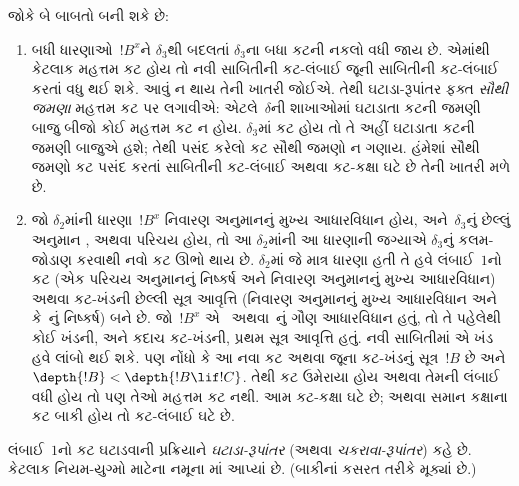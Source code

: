 જોકે બે બાબતો
બની શકે છે:
\begin{enumerate}
  \item બધી
  ધારણાઓ~$!B^x$ને
  $\delta_3$થી બદલતાં
  $\delta_3$ના બધા
  કટની નકલો વધી
  જાય છે. એમાંથી
  કેટલાક મહત્તમ
  કટ હોય તો
  નવી સાબિતીની
  કટ-લંબાઈ જૂની
  સાબિતીની કટ-લંબાઈ
  કરતાં વધુ થઈ
  શકે. આવું
  ન થાય તેની
  ખાતરી જોઈએ.
  તેથી ઘટાડા-રૂપાંતર
  ફક્ત \emph{સૌથી
  જમણા} મહત્તમ
  કટ પર લગાવીએ:
  એટલે~$\delta$ની
  શાખાઓમાં ઘટાડાતા
  કટની જમણી બાજુ
  બીજો કોઈ
  મહત્તમ કટ ન
  હોય. $\delta_3$માં
  કટ હોય તો
  તે અહીં ઘટાડાતા
  કટની જમણી
  બાજુએ હશે;
  તેથી પસંદ કરેલો
  કટ સૌથી જમણો
  ન ગણાય. હંમેશાં
  સૌથી જમણો
  કટ પસંદ કરતાં
  સાબિતીની
  કટ-લંબાઈ અથવા
  કટ-કક્ષા ઘટે
  છે તેની ખાતરી
  મળે છે.
  \item જો
  $\delta_2$માંની
  ધારણા~$!B^x$
  નિવારણ
  અનુમાનનું મુખ્ય
  આધારવિધાન હોય,
  અને~$\delta_3$નું
  છેલ્લું અનુમાન
  \Elim{\lor},
  \Elim{\lexists}
  અથવા પરિચય
  હોય, તો આ
  $\delta_2$માંની આ
  ધારણાની જગ્યાએ
  $\delta_3$નું
  કલમ-જોડાણ
  કરવાથી નવો
  કટ ઊભો થાય
  છે. $\delta_2$માં
  જે માત્ર ધારણા
  હતી તે હવે
  લંબાઈ~$1$નો
  કટ (એક
  પરિચય
  અનુમાનનું નિષ્કર્ષ
  અને નિવારણ
  અનુમાનનું મુખ્ય
  આધારવિધાન) અથવા
  કટ-ખંડની
  છેલ્લી સૂત્ર
  આવૃત્તિ
  (નિવારણ
  અનુમાનનું
  મુખ્ય આધારવિધાન
  અને~\Elim{\lor}
  કે~\Elim{\lexists}નું
  નિષ્કર્ષ) બને
  છે. જો~$!B^x$
  એ~\Elim{\lor}
  અથવા~\Elim{\lexists}નું
  ગૌણ આધારવિધાન
  હતું, તો તે
  પહેલેથી કોઈ
  ખંડની, અને
  કદાચ કટ-ખંડની,
  પ્રથમ સૂત્ર
  આવૃત્તિ હતું.
  નવી સાબિતીમાં
  એ ખંડ હવે
  લાંબો થઈ શકે.
  પણ નોંધો કે
  આ નવા કટ
  અથવા જૂના
  કટ-ખંડનું
  સૂત્ર~$!B$
  છે અને
  $\depth{!B} < \depth{!B \lif !C}$.
  તેથી કટ ઉમેરાયા
  હોય અથવા તેમની
  લંબાઈ વધી હોય
  તો પણ તેઓ
  મહત્તમ કટ નથી.
  આમ કટ-કક્ષા
  ઘટે છે; અથવા
  સમાન કક્ષાના
  કટ બાકી હોય
  તો કટ-લંબાઈ
  ઘટે છે.
\end{enumerate}

લંબાઈ~$1$નો
કટ ઘટાડવાની
પ્રક્રિયાને
\emph{ઘટાડા-રૂપાંતર}
(અથવા
\emph{ચકરાવા-રૂપાંતર})
કહે છે.
કેટલાક નિયમ-યુગ્મો
માટેના નમૂના
માં
આપ્યાં છે.
(બાકીનાં કસરત
તરીકે મૂક્યાં છે.)

